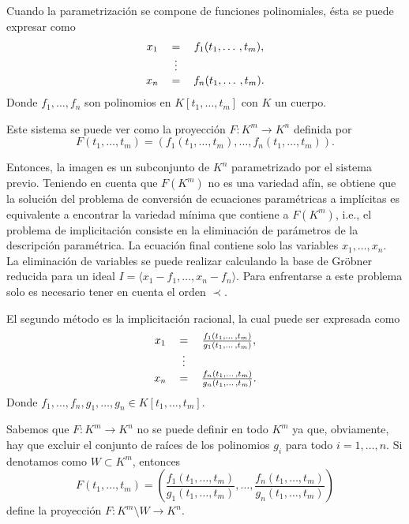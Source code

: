 Cuando la parametrización se compone de funciones polinomiales, ésta se puede expresar como
\begin{equation}
\begin{tabular}{c c c}
$x_1$ & $=$ & $f_1(t_1, \dotso, t_m)$, \\
 & $\vdots$ &  \\
$x_n$ & $=$ & $f_n(t_1, \dotso, t_m)$.
\end{tabular}
\nonumber
\end{equation}
Donde $f_1, \dotso, f_n$ son polinomios en $K[t_1, \dotso, t_m]$ con $K$ un cuerpo.

Este sistema se puede ver como la proyección $F : K^m \to K^n$ definida por
$$F(t_1,\dotso, t_m) = (f_1(t_1,\dotso, t_m), \dotso, f_n(t_1,\dotso, t_m)).$$

Entonces, la imagen es un subconjunto de $K^n$ parametrizado por el sistema previo. Teniendo en cuenta que $F(K^m)$ no es una variedad afín, se obtiene que la solución del problema de conversión de ecuaciones paramétricas a implícitas es equivalente a encontrar la variedad mínima que contiene a $F(K^m)$, i.e., el problema de implicitación consiste en la eliminación de parámetros de la descripción paramétrica. La ecuación final contiene solo las variables $x_1, \dotso, x_n$.
\\La eliminación de variables se puede realizar calculando la base de Gröbner reducida para un ideal $I = \langle x_1 - f_1, \dotso, x_n - f_n \rangle$. Para enfrentarse a este problema solo es necesario tener en cuenta el orden $\prec$.

El segundo método es la implicitación racional, la cual puede ser expresada como
\begin{equation}
\begin{tabular}{c c c}
$x_1$ & $=$ & $\frac{f_1(t_1, \dotso, t_m)}{g_1(t_1, \dotso, t_m)}$, \\
 & $\vdots$ &  \\
$x_n$ & $=$ & $\frac{f_n(t_1, \dotso, t_m)}{g_n(t_1, \dotso, t_m)}$.
\end{tabular}
\nonumber
\end{equation}
Donde $f_1, \dotso, f_n, g_1, \dotso, g_n \in K[t_1, \dotso, t_m]$.

Sabemos que $F : K^m \to K^n$ no se puede definir en todo $K^m$ ya que, obviamente, hay que excluir el conjunto de raíces de los polinomios $g_i$ para todo $i = 1, \dotso, n$. Si denotamos como $W \subset K^m$, entonces
$$F(t_1, \dotso, t_m) = \left( \frac{f_1(t_1, \dotso, t_m)}{g_1(t_1, \dotso, t_m)}, \dotso, \frac{f_n(t_1, \dotso, t_m)}{g_n(t_1, \dotso, t_m)}  \right)$$
define la proyección $F : K^m \setminus W \to K^n$.

